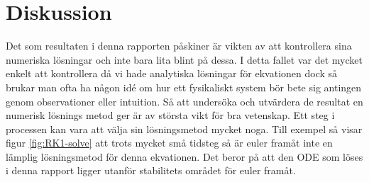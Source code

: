 \documentclass[12pt]{article}
\begin{document}
\section{Diskussion}
Det som resultaten i denna rapporten påskiner är vikten av att kontrollera sina numeriska lösningar och inte bara lita blint på dessa. I detta fallet var det mycket enkelt att kontrollera då vi hade analytiska lösningar för ekvationen dock så brukar man ofta ha någon idé om hur ett fysikaliskt system bör bete sig antingen genom observationer eller intuition. Så att undersöka och utvärdera de resultat en numerisk lösnings metod ger är av största vikt för bra vetenskap. Ett steg i processen kan vara att välja sin lösningsmetod mycket noga. Till exempel så visar figur \ref{fig:RK1-solve} att trots mycket små tidsteg så är euler framåt inte en lämplig lösningsmetod för denna ekvationen. Det beror på att den ODE som löses i denna rapport ligger utanför stabilitets området för euler framåt. 
\end{document}
